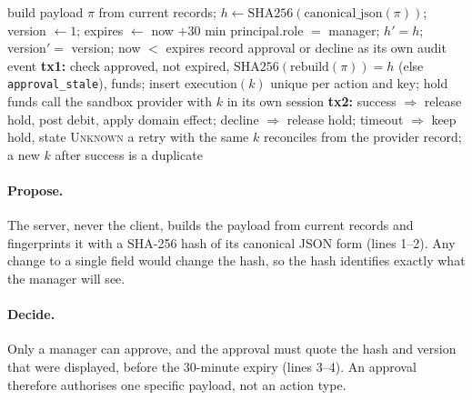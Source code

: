 \documentclass[11pt,letterpaper]{article}
\begin{document}
\begin{algorithm}[H]
\caption{Approval-bound, idempotent action execution}
\label{alg:execute}
\begin{algorithmic}[1]
  \State build payload $\pi$ from current records; $h \gets \mathrm{SHA256}(\mathrm{canonical\_json}(\pi))$; version $\gets 1$; expires $\gets$ now $+ 30$ min
\EndProcedure
{}
  \Require principal.role $=$ manager; $h' = h$; version$' =$ version; now $<$ expires
  \State record approval or decline as its own audit event
\EndProcedure
{}
  \State \textbf{tx1:} check approved, not expired, $\mathrm{SHA256}(\text{rebuild}(\pi)) = h$ (else \texttt{approval\_stale}), funds; insert execution$(k)$ unique per action and key; hold funds
  \State call the sandbox provider with $k$ in its own session 
  \State \textbf{tx2:} success $\Rightarrow$ release hold, post debit, apply domain effect; decline $\Rightarrow$ release hold; timeout $\Rightarrow$ keep hold, state \textsc{Unknown}
  \State a retry with the same $k$ reconciles from the provider record; a new $k$ after success is a duplicate
\EndProcedure
\end{algorithmic}
\end{algorithm}

\paragraph{Propose.} The server, never the client, builds the payload from current records and fingerprints it with a SHA-256 hash of its canonical JSON form (lines 1--2). Any change to a single field would change the hash, so the hash identifies exactly what the manager will see.

\paragraph{Decide.} Only a manager can approve, and the approval must quote the hash and version that were displayed, before the 30-minute expiry (lines 3--4). An approval therefore authorises one specific payload, not an action type.
\end{document}
